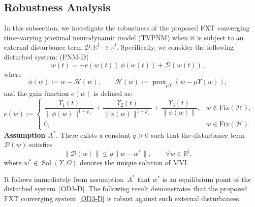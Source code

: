\documentclass{article}
\theoremstyle{plain}%
\theoremstyle{thmstyletwo}%
\theoremstyle{thmstylethree}%
\begin{document}
\subsection{Robustness Analysis}
In this subsection, we investigate the robustness of the proposed FXT
converging time-varying proximal neurodynamic model (TVPNM) when it is subject
to an external disturbance term
$\mathcal{D}:\mathbb{R}^l \to \mathbb{R}^l$.
Specifically, we consider the following disturbed system: (PNM-D)
\begin{equation}\label{OD3-D}
\dot{w}(t)
=
- e(w(t))\,\phi(w(t))
+ \mathcal{D}(w(t)),
\end{equation}
where
\[
\phi(w) := w -\mathcal{H}(w), \qquad
\mathcal{H}(w):=\operatorname{prox}_{\mu\Upsilon}(w -\mu\Upsilon(w)),
\]
and the gain function $e(w)$ is defined as:
\[
e(w):=
\begin{cases}
\dfrac{\Upsilon_1(t)}{\|\phi(w)\|^{1-\rho_1}}
+\dfrac{\Upsilon_2(t)}{\|\phi(w)\|^{1-\rho_2}}
+\dfrac{\Upsilon_3(t)}{\|\phi(w)\|},
& w\notin \mathrm{Fix}(\mathcal{H}),\\[2mm]
0, & w \in \mathrm{Fix}(\mathcal{H}).
\end{cases}
\]
\medskip
\noindent
\textbf{Assumption $A^*$.}
There exists a constant $q>0$ such that the disturbance term
$\mathcal{D}(w)$ satisfies
\[
\|\mathcal{D}(w)\| \le q \|w-w^*\|,
\qquad \forall w\in\mathbb{R}^l,
\]
where $w^*\in\operatorname{Sol}(\Upsilon,\Omega)$ denotes the unique solution of MVI.

\medskip
It follows immediately from assumption~\textbf{$A^*$} that $w^*$ is an equilibrium point of the disturbed system~\eqref{OD3-D}.
The following result demonstrates that the proposed FXT converging system~\eqref{OD3-D} is robust against such external disturbances.\\
\end{document}
